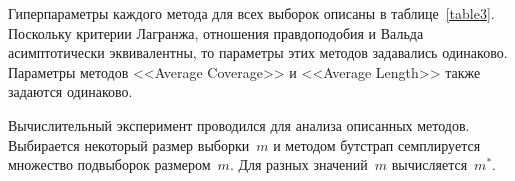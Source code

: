 Гиперпараметры каждого метода для всех выборок описаны в таблице~\ref{table3}. Поскольку критерии Лагранжа, отношения правдоподобия и Вальда асимптотически эквивалентны, то параметры этих методов задавались одинаково. Параметры методов <<Average Coverage>> и <<Average Length>> также задаются одинаково.

\begin{table}[h!]
\begin{center}
\caption{Экспертные оценки гиперпараметров для разных методов оценки объема выборки}
\label{table3}
\end{center}
\end{table}


Вычислительный эксперимент проводился для анализа описанных методов. Выбирается некоторый размер выборки~$m$ и методом бутстрап семплируется множество подвыборок размером~$m$. Для разных значений~$m$ вычисляется~$m^*$.
    
